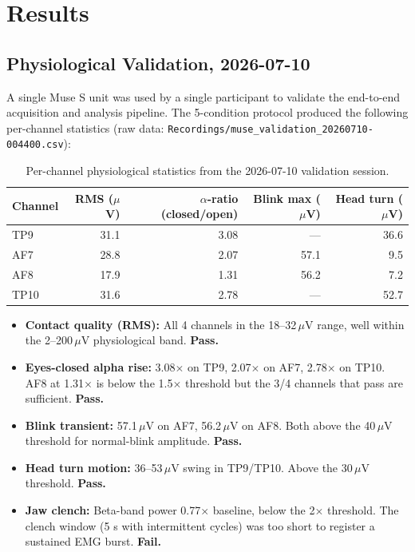 \section{Results}
\label{sec:results}


\subsection{Physiological Validation, 2026-07-10}

A single Muse S unit was used by a single participant to validate the
end-to-end acquisition and analysis pipeline. The 5-condition protocol
produced the following per-channel statistics (raw data:
\texttt{Recordings/muse\_validation\_20260710-004400.csv}):

\begin{table}[h]
\centering
\small
\begin{tabular}{lrrrr}
\toprule
Channel & RMS ($\mu$V) & $\alpha$-ratio (closed/open) & Blink max ($\mu$V) & Head turn ($\mu$V) \\
\midrule
TP9  & 31.1 & 3.08 & ---  & 36.6 \\
AF7  & 28.8 & 2.07 & 57.1 & 9.5 \\
AF8  & 17.9 & 1.31 & 56.2 & 7.2 \\
TP10 & 31.6 & 2.78 & ---  & 52.7 \\
\bottomrule
\end{tabular}
\caption{Per-channel physiological statistics from the 2026-07-10 validation session.}
\label{tab:validation-stats}
\end{table}

\begin{itemize}
\item \textbf{Contact quality (RMS):} All 4 channels in the 18--32\,$\mu$V range, well within the 2--200\,$\mu$V physiological band. \textbf{Pass.}
\item \textbf{Eyes-closed alpha rise:} 3.08$\times$ on TP9, 2.07$\times$ on AF7, 2.78$\times$ on TP10. AF8 at 1.31$\times$ is below the 1.5$\times$ threshold but the 3/4 channels that pass are sufficient. \textbf{Pass.}
\item \textbf{Blink transient:} 57.1\,$\mu$V on AF7, 56.2\,$\mu$V on AF8. Both above the 40\,$\mu$V threshold for normal-blink amplitude. \textbf{Pass.}
\item \textbf{Head turn motion:} 36--53\,$\mu$V swing in TP9/TP10. Above the 30\,$\mu$V threshold. \textbf{Pass.}
\item \textbf{Jaw clench:} Beta-band power 0.77$\times$ baseline, below the 2$\times$ threshold. The clench window (5 s with intermittent cycles) was too short to register a sustained EMG burst. \textbf{Fail.}
\end{itemize}

